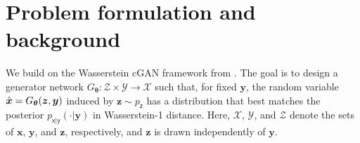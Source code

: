 \documentclass{article}
\theoremstyle{plain}
\theoremstyle{definition}
\theoremstyle{remark}
\newcommand{\hvec}[1]{\ensuremath{\Hat{\boldsymbol{#1}}}}
\renewcommand{\vec}[1]{\ensuremath{\boldsymbol{#1}}}
\newcommand{\mc}[1]{\ensuremath{\mathcal{#1}}}
\newcommand{\pxgy}{p_{\mathsf{x}|\mathsf{y}}}
\newcommand{\pz}{p_{\mathsf{z}}}
\begin{document}
%

\section{Problem formulation and background}

We build on the Wasserstein cGAN framework from \cite{Adler:18}. 
The goal is to design a generator network $G_{\vec{\theta}}:\mc{Z}\times\mc{Y}\rightarrow\mc{X}$ such that, for fixed $\vec{y}$, the random variable $\hvec{x}=G_{\vec{\theta}}(\vec{z},\vec{y})$ induced by $\vec{z}\sim\pz$ has a distribution that best matches the posterior $\pxgy(\cdot|\vec{y})$ in Wasserstein-1 distance.
Here,  $\mc{X}$, $\mc{Y}$, and $\mc{Z}$ denote the sets of $\vec{x}$, $\vec{y}$, and $\vec{z}$, respectively, and $\vec{z}$ is drawn independently of $\vec{y}$. 
\end{document}
